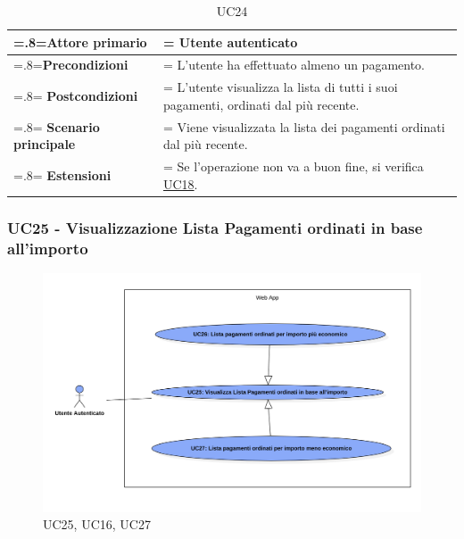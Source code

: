             \begin{table}[H]
                \centering
                \renewcommand{\arraystretch}{1.8}
                \renewcommand\tabularxcolumn[1]{m{#1}}
                \begin{tabularx}{0.9\textwidth} {
                    >{\hsize=.8\hsize\linewidth=\hsize}X
                    >{\hsize=1.2\hsize\linewidth=\hsize}X}
                    \hline
                    \textbf{Attore primario} & Utente autenticato \\
                    \hline
                    \textbf{Precondizioni} & L'utente ha effettuato almeno un pagamento. \\
                    \hline
                    \textbf{Postcondizioni} & L'utente visualizza la lista di tutti i suoi pagamenti, ordinati dal più recente. \\
                    \hline
                    \textbf{Scenario principale} & Viene visualizzata la lista dei pagamenti ordinati dal più recente. \\
                    \hline
                    \textbf{Estensioni} & Se l'operazione non va a buon fine, si verifica \hyperref[UC18]{UC18}. \\
                    \hline
                \end{tabularx}
                \caption{UC24}
            \end{table}

            \subsubsection{UC25 - Visualizzazione Lista Pagamenti ordinati in base all'importo}
        \label{UC25}

        \begin{figure}[H]
            \centering
            \includegraphics[scale=0.4]{src/img/UC25.png}
            \caption{UC25, UC16, UC27}
        \end{figure}


